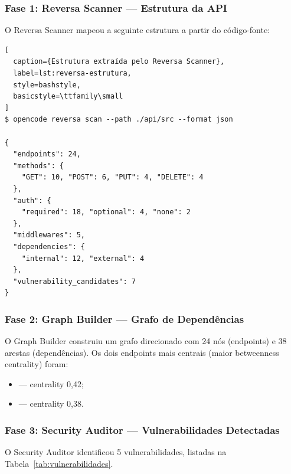 \subsubsection{Fase 1: Reversa Scanner --- Estrutura da API}

O Reversa Scanner mapeou a seguinte estrutura a partir do código-fonte:

\begin{lstlisting}[
  caption={Estrutura extraída pelo Reversa Scanner},
  label=lst:reversa-estrutura,
  style=bashstyle,
  basicstyle=\ttfamily\small
]
$ opencode reversa scan --path ./api/src --format json

{
  "endpoints": 24,
  "methods": {
    "GET": 10, "POST": 6, "PUT": 4, "DELETE": 4
  },
  "auth": {
    "required": 18, "optional": 4, "none": 2
  },
  "middlewares": 5,
  "dependencies": {
    "internal": 12, "external": 4
  },
  "vulnerability_candidates": 7
}
\end{lstlisting}

\subsubsection{Fase 2: Graph Builder --- Grafo de Dependências}

O Graph Builder construiu um grafo direcionado com 24 nós (endpoints)
e 38 arestas (dependências). Os dois endpoints mais centrais
(maior betweenness centrality) foram:

\begin{itemize}
    \item {} --- centrality 0,42;
    \item {} --- centrality 0,38.
\end{itemize}

\subsubsection{Fase 3: Security Auditor --- Vulnerabilidades Detectadas}

O Security Auditor identificou 5 vulnerabilidades, listadas na
Tabela~\ref{tab:vulnerabilidades}.

